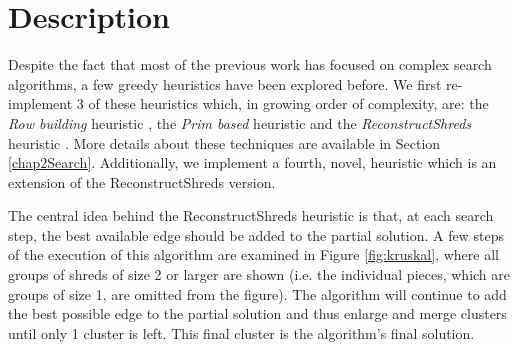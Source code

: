 \section{Description}
\label{chap5Desc}
Despite the fact that most of the previous work has focused on complex search algorithms, a few greedy heuristics have been explored before. We first re-implement 3 of these heuristics which, in growing order of complexity, are: the \emph{Row building} heuristic \cite{P5}, the \emph{Prim based} heuristic \cite{P5} and the \emph{ReconstructShreds} heuristic \cite{P2}. More details about these techniques are available in Section \ref{chap2Search}. Additionally, we implement a fourth, novel, heuristic which is an extension of the ReconstructShreds version. 

The central idea behind the ReconstructShreds heuristic is that, at each search step, the best available edge should be added to the partial solution. A few steps of the execution of this algorithm are examined in Figure \ref{fig:kruskal}, where all groups of shreds of size 2 or larger are shown (i.e. the individual pieces, which are groups of size 1, are omitted from the figure). The algorithm will continue to add the best possible edge to the partial solution and thus enlarge and merge clusters until only 1 cluster is left. This final cluster is the algorithm's final solution. 

